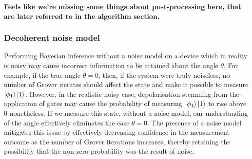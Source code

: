 \textbf{Feels like we're missing some things about post-processing here, that are later referred to in the algorithm section.}

\subsubsection{Decoherent noise model}

Performing Bayesian inference without a noise model on a device which in reality is noisy may cause incorrect information to be attained about the angle $\theta$. For example, if the true angle $\theta = 0$, then, if the system were truly noiseless, no number of Grover iterates should affect the state and make it possible to measure $\ket{\phi_1} \ket{1}$. However, in the realistic noisy case, depolarisation stemming from the application of gates may cause the probability of measuring $\ket{\phi_1} \ket{1}$ to rise above $0$ nonetheless. If we measure this state, without a noise model, our understanding of the angle effectively eliminates the case $\theta = 0$. The presence of a noise model mitigates this issue by effectively decreasing confidence in the measurement outcome as the number of Grover iterations increases, thereby retaining the possibility that the non-zero probability was the result of noise.

